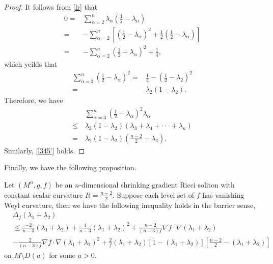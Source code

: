 \documentclass[12pt]{amsart}
\begin{document}
	
	\begin{proof}
		It follows from \eqref{lr} that
		\begin{equation*}
		\begin{aligned}
		0=&\sum_{\alpha=2}^n\lambda_{\alpha}({\frac{1}{2}}-\lambda_{\alpha})\\
		=&-\sum_{\alpha=2}^n\left[ ({\frac{1}{2}}-\lambda_{\alpha})^2+\frac{1}{2}({\frac{1}{2}}-\lambda_{\alpha})\right] \\
		=&-\sum_{\alpha=2}^n({\frac{1}{2}}-\lambda_\alpha)^2+\frac{1}{4},
		\end{aligned}
		\end{equation*}
		which yeilds that
		\begin{equation*}
		\begin{aligned}
		\sum_{\alpha=3}^n({\frac{1}{2}}-\lambda_{\alpha})^2
		=&\frac{1}{4}-({\frac{1}{2}}-\lambda_2)^2\\
		=&\lambda_2(1-\lambda_2).		
		\end{aligned}
		\end{equation*}
		Therefore, we have
		\begin{equation*}
		\begin{aligned}
		&\,\sum_{\alpha=3}^n(\frac{1}{2}-\lambda_\alpha)^2\lambda_\alpha\\
		\leq&\, \lambda_2(1-\lambda_2) (\lambda_3+\lambda_4+\cdot\cdot\cdot+\lambda_n)\\
		=&\,\lambda_2(1-\lambda_2)(\frac{n-2}{2}-\lambda_2).		
		\end{aligned}
		\end{equation*}
		Similarly, \eqref{l345'} holds.
		
	\end{proof}
	
	Finally, we have the following proposition.
	
	\begin{prop}\label{lap12}
		Let $(M^n, g, f)$ be an $n$-dimensional shrinking gradient Ricci soliton with constant scalar curvature $R=\frac{n-2}{2}$.  Suppose each level set of $f$ has vanishing Weyl curvature, then we have the following inequality holds in the barrier sense,
		\begin{equation*}
		\begin{aligned}
		&\Delta_f(\lambda_1+\lambda_2)\\
		&\leq\frac{-2}{n-3}(\lambda_1+\lambda_2)+\frac{4}{n-3}(\lambda_1+\lambda_2)^2+\frac{n-2}{(n-3)f}\nabla f\cdot \nabla (\lambda_1+\lambda_2)\\
&-\frac{2}{(n-3)f}\nabla f\cdot \nabla (\lambda_1+\lambda_2)^2+\frac{2}{f}(\lambda_1+\lambda_2)\left[1-(\lambda_1+\lambda_2)\right]\left[\frac{n-2}{2}-(\lambda_1+\lambda_2)\right]
		\end{aligned}
		\end{equation*}	
		on $M\setminus D(a)$ for some $a>0$.	
	\end{prop}
	
\end{document}
